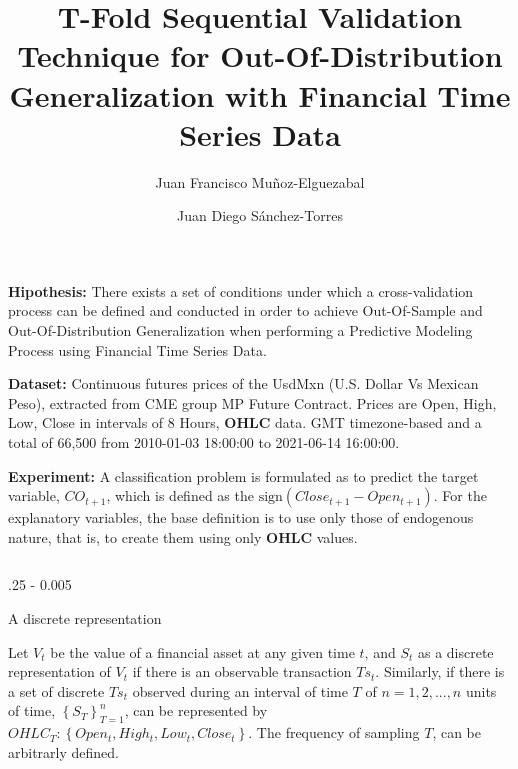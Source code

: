 \documentclass{postertheme}\usepackage[]{graphicx}\usepackage[]{color}
\title{T-Fold Sequential Validation Technique for Out-Of-Distribution Generalization with Financial
       Time Series Data}
\author {Juan Francisco Muñoz-Elguezabal \inst{1} \and Juan Diego Sánchez-Torres \inst{1}}
\institute {\inst{1} Mathematics \& Physics Department - 
Western Institute of Technology and Higher Education (ITESO)}
\begin{document}
\begin{frame}


\footnotesize
    \textbf{Hipothesis:}
      There exists a set of conditions under which a cross-validation process can be defined and conducted in
      order to achieve Out-Of-Sample and Out-Of-Distribution Generalization when performing a Predictive
      Modeling Process using Financial Time Series Data.
      
    \textbf{Dataset:}
      Continuous futures prices of the UsdMxn (U.S. Dollar Vs Mexican Peso),
      extracted from CME group MP Future Contract. Prices are Open, High, Low, Close
      in intervals of 8 Hours, \textbf{OHLC} data. GMT timezone-based and a total of 66,500 
      from 2010-01-03 18:00:00 to 2021-06-14 16:00:00.
    
    \textbf{Experiment:}
      A classification problem is formulated as to predict the target variable, $CO_{t+1}$, which is defined
      as the $\text{sign}(Close_{t+1} - Open_{t+1})$. For the explanatory variables, the base definition is to
      use only those of endogenous nature, that is, to create them using only \textbf{OHLC} values.
      

\begin{columns}[onlytextwidth]
  
  \begin{column}{.25 \textwidth - 0.005 \textwidth}
    \begin{block}{A discrete representation} \footnotesize
    
      Let $V_{t}$ be the value of a financial asset at any given time $t$, and $S_{t}$ as a discrete 
      representation of $V_{t}$ if there is an observable transaction $Ts_{t}$. Similarly, if there is 
      a set of discrete $Ts_{t}$ observed during an interval of time $T$ of $n = 1, 2, ... , n$ units of time, 
      $\left\{ S_{T} \right\}_{T=1}^{n}$, can be represented by
      $OHLC_{T}: \left\{ Open_{t}, High_{t}, Low_{t}, Close_{t} \right\}$. The frequency of sampling $T$,
      can be arbitrarly defined. 
      

\end{block}
\end{column}
\end{columns}
\end{frame}
\end{document}
